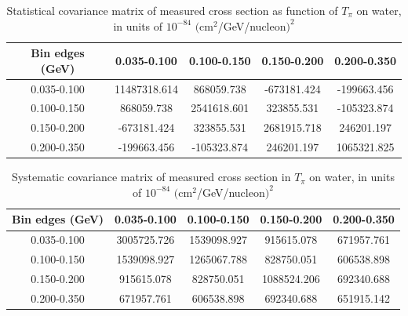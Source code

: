 \documentclass[../main.tex]{subfiles}
\begin{document}
\begin{table}
  \centering
  \renewcommand{\arraystretch}{1.15}
  \caption{Statistical covariance matrix of measured cross section as function of $T_{\pi}$ on water, in units of $10^{-84}$ $(\text{cm}^2$/GeV/nucleon$)^2$}
    \begin{tabular}{c||cccc}
      Bin edges (GeV) & 0.035-0.100 & 0.100-0.150 & 0.150-0.200 & 0.200-0.350\\
      \hline
      \hline
      0.035-0.100 & 11487318.614 & 868059.738 & -673181.424 & -199663.456\\
      0.100-0.150 & 868059.738 & 2541618.601 & 323855.531 & -105323.874\\
      0.150-0.200 & -673181.424 & 323855.531 & 2681915.718 & 246201.197\\
      0.200-0.350 & -199663.456 & -105323.874 & 246201.197 & 1065321.825
    \end{tabular}
  \label{tbl:statnucleonnuc10pion_ekinb}
\end{table}
\begin{table}
  \centering
  \renewcommand{\arraystretch}{1.15}
  \caption{Systematic covariance matrix of measured cross section in $T_{\pi}$ on water, in units of $10^{-84}$ $(\text{cm}^2$/GeV/nucleon$)^2$}
    \begin{tabular}{c||cccc}
      Bin edges (GeV) & 0.035-0.100 & 0.100-0.150 & 0.150-0.200 & 0.200-0.350\\
      \hline
      \hline
      0.035-0.100 & 3005725.726 & 1539098.927 & 915615.078 & 671957.761\\
      0.100-0.150 & 1539098.927 & 1265067.788 & 828750.051 & 606538.898\\
      0.150-0.200 & 915615.078 & 828750.051 & 1088524.206 & 692340.688\\
      0.200-0.350 & 671957.761 & 606538.898 & 692340.688 & 651915.142
    \end{tabular}
  \label{tbl:sysnucleonnuc10pion_ekinc}
\end{table}
\pagebreak
\begin{turnpage}
\end{turnpage}
\end{document}
